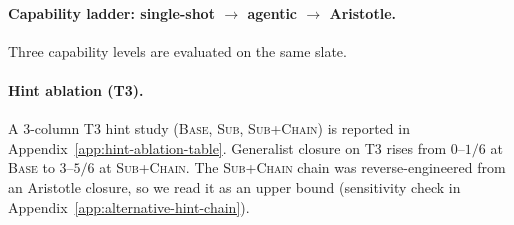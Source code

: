 \begin{table}[t]
\centering
\small
\caption{Per-drafter closure rates on the $60$-target benchmark at $N{=}5$
(one greedy $+$ four $T{=}0.7$ samples). Overall column sums the
$60$-target benchmark (T4/T5 zero by
construction). Wilson CIs in Appendix~\ref{tab:wilson-ci}.
See Appendix~\ref{app:robustness-n10} for $N{=}10$ results.}
\label{tab:headline}

\end{table}

\paragraph{Capability ladder: single-shot $\to$ agentic $\to$ Aristotle.}
\label{sec:capability-ladder}
Three capability levels are evaluated on the same slate.

\paragraph{Hint ablation (T3).} A 3-column T3 hint study
(\textsc{Base}, \textsc{Sub}, \textsc{Sub+Chain}) is reported in
Appendix~\ref{app:hint-ablation-table}. Generalist closure on
T3 rises from $0$--$1/6$ at \textsc{Base} to $3$--$5/6$ at
\textsc{Sub+Chain}. The \textsc{Sub+Chain} chain was
reverse-engineered from an Aristotle closure, so we read it
as an upper bound (sensitivity check in
Appendix~\ref{app:alternative-hint-chain}).

